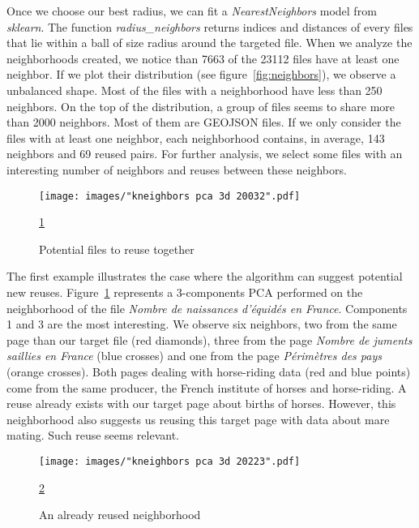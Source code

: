 \documentclass[a4paper]{article}
\begin{document}
	Once we choose our best radius, we can fit a \emph{NearestNeighbors} model from \emph{sklearn}. The function \emph{radius\_neighbors} returns indices and distances of every files that lie within a ball of size radius around the targeted file. When we analyze the neighborhoods created, we notice than 7663 of the 23112 files have at least one neighbor. If we plot their distribution (see figure~\ref{fig:neighbors}), we observe a unbalanced shape. Most of the files with a neighborhood have less than 250 neighbors. On the top of the distribution, a group of files seems to share more than 2000 neighbors. Most of them are GEOJSON files. If we only consider the files with at least one neighbor, each neighborhood contains, in average, 143 neighbors and 69 reused pairs. For further analysis, we select some files with an interesting number of neighbors and reuses between these neighbors. 

	\begin{figure}[]
		\texttt{[image: images/"kneighbors pca 3d 20032".pdf]}
		\caption{Potential files to reuse together}
		\label{fig:pca horse}
		\ref{fig:pca horse}
	\end{figure}
	
	The first example illustrates the case where the algorithm can suggest potential new reuses. Figure~\ref{fig:pca horse} represents a 3-components PCA performed on the neighborhood of the file \emph{Nombre de naissances d'équidés en France}. Components 1 and 3 are the most interesting. We observe six neighbors, two from the same page than our target file (red diamonds), three from the page \emph{Nombre de juments saillies en France} (blue crosses) and one from the page \emph{Périmètres des pays} (orange crosses). Both pages dealing with horse-riding data (red and blue points) come from the same producer, the French institute of horses and horse-riding. A reuse already exists with our target page about births of horses. However, this neighborhood also suggests us reusing this target page with data about mare mating. Such reuse seems relevant. 
	
	\begin{figure}[]
		\texttt{[image: images/"kneighbors pca 3d 20223".pdf]}
		\caption{An already reused neighborhood}
		\label{fig:pca election}
		\ref{fig:pca election}
	\end{figure}
	
\end{document}
